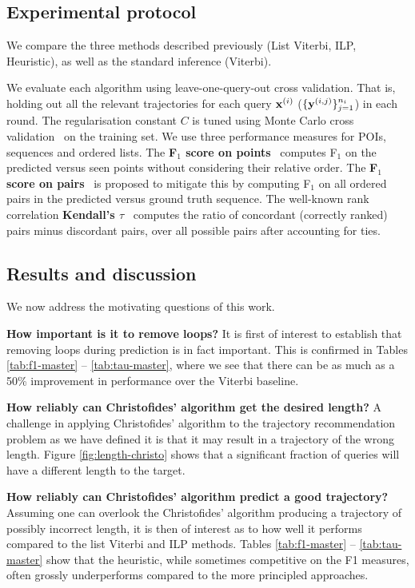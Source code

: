 %
\subsection{Experimental protocol}

We compare the three methods described previously ({\sc List Viterbi}, {\sc ILP}, {\sc Heuristic}),
as well as the standard inference ({\sc Viterbi}).

We evaluate each algorithm using leave-one-query-out cross validation.
That is, holding out all the relevant trajectories for each query $\mathbf{x}^{(i)}$ (\ie $\{\mathbf{y}^{(i,j)}\}_{j=1}^{n_i}$) in each round.
The regularisation constant $C$ is tuned using Monte Carlo cross validation~\cite{burman1989comparative} on the training set.
We use three performance measures for POIs, sequences and ordered lists.
The {\bf F$_1$ score on points}~\cite{ijcai15} computes F$_1$ on the predicted versus seen points
without considering their relative order.
The {\bf F$_1$ score on pairs}~\cite{cikm16paper} is proposed to mitigate this by computing F$_1$ on all ordered pairs in the predicted versus ground truth sequence. %
The well-known rank correlation {\bf Kendall's $\tau$}~\cite{agresti2010analysis}
computes the ratio of concordant (correctly ranked) pairs minus discordant pairs, over all possible pairs after accounting for ties.%


%
\subsection{Results and discussion}

We now address the motivating questions of this work.

\textbf{How important is it to remove loops?}
It is first of interest to establish that removing loops during prediction is in fact important.
This is confirmed in Tables \ref{tab:f1-master} -- \ref{tab:tau-master},
where we see that there can be as much as a 50\% improvement in performance over the {\sc Viterbi} baseline.

\textbf{How reliably can Christofides' algorithm get the desired length?}
A challenge in applying Christofides' algorithm to the trajectory recommendation problem as we have defined it
is that it may result in a trajectory of the wrong length.
Figure \ref{fig:length-christo} shows that a significant fraction of queries will have a different length to the target.

\textbf{How reliably can Christofides' algorithm predict a good trajectory?}
Assuming one can overlook the Christofides' algorithm producing a trajectory of possibly incorrect length,
it is then of interest as to how well it performs compared to the list Viterbi and ILP methods.
Tables \ref{tab:f1-master} -- \ref{tab:tau-master} show that the heuristic, while sometimes competitive on the F1 measures, often
grossly underperforms compared to the more principled approaches.

